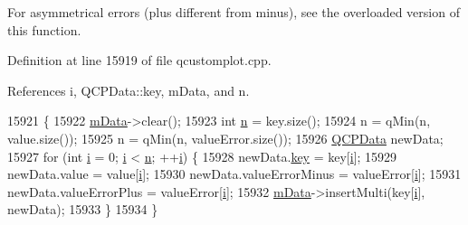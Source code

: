 For asymmetrical errors (plus different from minus), see the overloaded version of this function. 

Definition at line 15919 of file qcustomplot.\+cpp.



References i, Q\+C\+P\+Data\+::key, m\+Data, and n.


\begin{DoxyCode}
15921                                                                     \{
15922   \hyperlink{class_q_c_p_graph_a8457c840f69a0ac49f61d30a509c5d08}{mData}->clear();
15923   \textcolor{keywordtype}{int} \hyperlink{_comparision_pictures_2_createtest_image_8m_aeab71244afb687f16d8c4f5ee9d6ef0e}{n} = key.size();
15924   n = qMin(n, value.size());
15925   n = qMin(n, valueError.size());
15926   \hyperlink{class_q_c_p_data}{QCPData} newData;
15927   \textcolor{keywordflow}{for} (\textcolor{keywordtype}{int} \hyperlink{_comparision_pictures_2_createtest_image_8m_a6f6ccfcf58b31cb6412107d9d5281426}{i} = 0; \hyperlink{_comparision_pictures_2_createtest_image_8m_a6f6ccfcf58b31cb6412107d9d5281426}{i} < \hyperlink{_comparision_pictures_2_createtest_image_8m_aeab71244afb687f16d8c4f5ee9d6ef0e}{n}; ++\hyperlink{_comparision_pictures_2_createtest_image_8m_a6f6ccfcf58b31cb6412107d9d5281426}{i}) \{
15928     newData.\hyperlink{class_q_c_p_data_a2f5ba9aca61bb74f88516e148a4cf71b}{key} = key[\hyperlink{_comparision_pictures_2_createtest_image_8m_a6f6ccfcf58b31cb6412107d9d5281426}{i}];
15929     newData.value = value[\hyperlink{_comparision_pictures_2_createtest_image_8m_a6f6ccfcf58b31cb6412107d9d5281426}{i}];
15930     newData.valueErrorMinus = valueError[\hyperlink{_comparision_pictures_2_createtest_image_8m_a6f6ccfcf58b31cb6412107d9d5281426}{i}];
15931     newData.valueErrorPlus = valueError[\hyperlink{_comparision_pictures_2_createtest_image_8m_a6f6ccfcf58b31cb6412107d9d5281426}{i}];
15932     \hyperlink{class_q_c_p_graph_a8457c840f69a0ac49f61d30a509c5d08}{mData}->insertMulti(key[\hyperlink{_comparision_pictures_2_createtest_image_8m_a6f6ccfcf58b31cb6412107d9d5281426}{i}], newData);
15933   \}
15934 \}
\end{DoxyCode}
\hypertarget{class_q_c_p_graph_a3afbfd7222d739351c69387904776f93}{}
